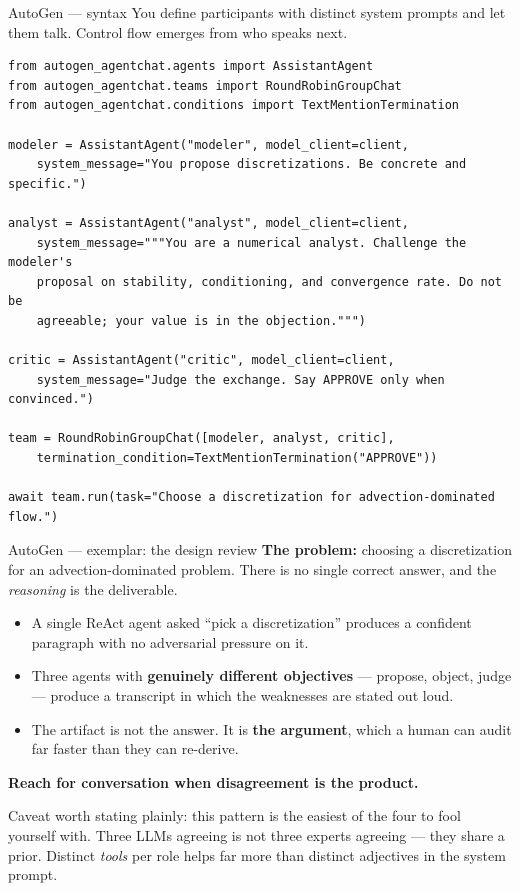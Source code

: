 \documentclass[aspectratio=169,10pt]{beamer}
\newcommand{\hl}[1]{\textcolor{accent}{\textbf{#1}}}
\begin{document}
\begin{frame}[fragile]{AutoGen --- syntax}
You define participants with distinct system prompts and let them talk. Control
flow emerges from who speaks next.

\begin{lstlisting}
from autogen_agentchat.agents import AssistantAgent
from autogen_agentchat.teams import RoundRobinGroupChat
from autogen_agentchat.conditions import TextMentionTermination

modeler = AssistantAgent("modeler", model_client=client,
    system_message="You propose discretizations. Be concrete and specific.")

analyst = AssistantAgent("analyst", model_client=client,
    system_message="""You are a numerical analyst. Challenge the modeler's
    proposal on stability, conditioning, and convergence rate. Do not be
    agreeable; your value is in the objection.""")

critic = AssistantAgent("critic", model_client=client,
    system_message="Judge the exchange. Say APPROVE only when convinced.")

team = RoundRobinGroupChat([modeler, analyst, critic],
    termination_condition=TextMentionTermination("APPROVE"))

await team.run(task="Choose a discretization for advection-dominated flow.")
\end{lstlisting}
\end{frame}

\begin{frame}{AutoGen --- exemplar: the design review}
\textbf{The problem:} choosing a discretization for an advection-dominated
problem. There is no single correct answer, and the \emph{reasoning} is the
deliverable.

\vspace{0.8em}
\begin{itemize}\itemsep5pt
  \item A single ReAct agent asked ``pick a discretization'' produces a
        confident paragraph with no adversarial pressure on it.
  \item Three agents with \hl{genuinely different objectives} --- propose,
        object, judge --- produce a transcript in which the weaknesses are
        stated out loud.
  \item The artifact is not the answer. It is \hl{the argument}, which a human
        can audit far faster than they can re-derive.
\end{itemize}

\vspace{1em}
\begin{center}
\hl{Reach for conversation when disagreement is the product.}
\end{center}

\vspace{0.5em}
{\small\color{gray}Caveat worth stating plainly: this pattern is the easiest of
the four to fool yourself with. Three LLMs agreeing is not three experts
agreeing --- they share a prior. Distinct \emph{tools} per role helps far more
than distinct adjectives in the system prompt.}
\end{frame}
\end{document}
